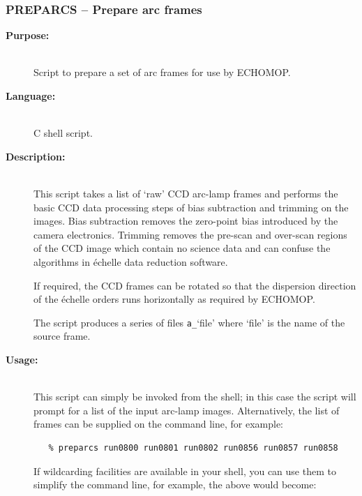 \documentclass[twoside,11pt]{article}
\newcommand{\stardocinitials}  {SC}
\newcommand{\stardocnumber}    {3.2-0} %
\newcommand{\stardocname}{\stardocinitials /\stardocnumber}
\newcommand{\xref}[3]{#1}
\newcommand{\xlabel}[1]{}
\newcommand{\scspec}[2]{#1}
\newcommand{\scspec}[2]{#2}
\begin{document}
\newpage
\subsubsection{\label{se_preparcs}\xlabel{preparcs}PREPARCS
                \scspec{--}{-} Prepare arc frames}
\markboth{PREPARCS}{\stardocname}

\begin{description}

\item [{\bf Purpose:}] \mbox{} \\
     Script to prepare a set of arc frames for use by
     \xref{ECHOMOP}{sun152}{}.

\item [{\bf Language:}] \mbox{} \\
     C shell script.

\item [{\bf Description:}] \mbox{} \\
     This script takes a list of `raw' CCD arc-lamp frames and performs
     the basic CCD data processing steps of bias subtraction and trimming
     on the images.  Bias subtraction removes the zero-point bias
     introduced by the camera electronics.  Trimming removes the pre-scan
     and over-scan regions of the CCD image which contain no science data
     and can confuse the algorithms in \'{e}chelle data reduction software.

     If required, the CCD frames can be rotated so that the dispersion
     direction of the \'{e}chelle orders runs horizontally as required by
     ECHOMOP.

     The script produces a series of files \verb+a_+`file' where `file'
     is the name of the source frame.

\item [{\bf Usage:}] \mbox{} \\
     This script can simply be invoked from the shell; in this case
     the script will prompt for a list of the input arc-lamp images.
     Alternatively, the list of frames can be supplied on the
     command line, for example:

\begin{verbatim}
   % preparcs run0800 run0801 run0802 run0856 run0857 run0858
\end{verbatim}

     If wildcarding facilities are available in your shell, you can use
     them to simplify the command line, for example, the above would
     become:


\end{description}
\end{document}
